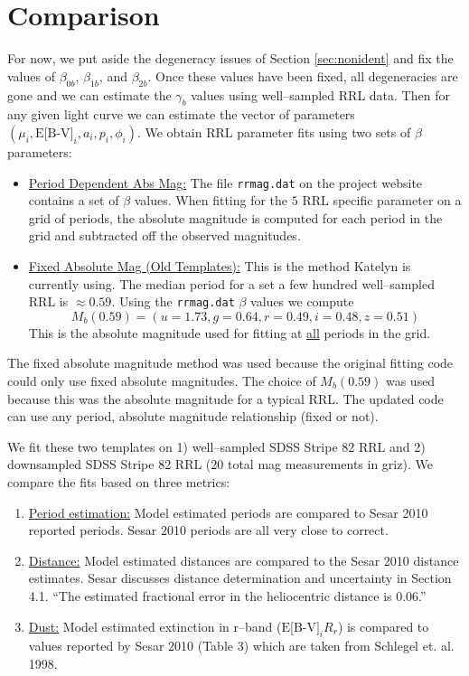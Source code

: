 \documentclass[12pt]{article}
\begin{document}
\section{Comparison}
\label{sec:compare}

For now, we put aside the degeneracy issues of Section \ref{sec:nonident} and fix the values of $\beta_{0b}$, $\beta_{1b}$, and $\beta_{2b}$. Once these values have been fixed, all degeneracies are gone and we can estimate the $\gamma_b$ values using well--sampled RRL data. Then for any given light curve we can estimate the vector of parameters $(\mu_i,\text{E[B-V]}_i,a_i,p_i,\phi_i)$. We obtain RRL parameter fits using two sets of $\beta$ parameters:
\begin{itemize}
\item \underline{Period Dependent Abs Mag:} The file \texttt{rrmag.dat} on the project website contains a set of $\beta$ values. When fitting for the $5$ RRL specific parameter on a grid of periods, the absolute magnitude is computed for each period in the grid and subtracted off the observed magnitudes.
\item \underline{Fixed Absolute Mag (Old Templates):} This is the method Katelyn is currently using. The median period for a set a few hundred well--sampled RRL is $\approx 0.59$. Using the \texttt{rrmag.dat} $\beta$ values we compute
  \begin{equation*}
    M_b(0.59) = (u=1.73,g=0.64,r=0.49,i=0.48,z=0.51)
  \end{equation*}
  This is the absolute magnitude used for fitting at \underline{all} periods in the grid.
\end{itemize}
The fixed absolute magnitude method was used because the original fitting code could only use fixed absolute magnitudes. The choice of $M_b(0.59)$ was used because this was the absolute magnitude for a typical RRL. The updated code can use any period, absolute magnitude relationship (fixed or not).

We fit these two templates on 1) well--sampled SDSS Stripe 82 RRL and 2) downsampled SDSS Stripe 82 RRL (20 total mag measurements in griz). We compare the fits based on three metrics:
\begin{enumerate}
\item \underline{Period estimation:} Model estimated periods are compared to Sesar 2010 reported periods. Sesar 2010 periods are all very close to correct.
\item \underline{Distance:} Model estimated distances are compared to the Sesar 2010 distance estimates. Sesar discusses distance determination and uncertainty in Section 4.1. ``The estimated fractional error in the heliocentric distance is 0.06.''
\item \underline{Dust:} Model estimated extinction in r--band ($\text{E[B-V]}_iR_r$) is compared to values reported by Sesar 2010 (Table 3) which are taken from Schlegel et. al. 1998.
\end{enumerate}
\end{document}
